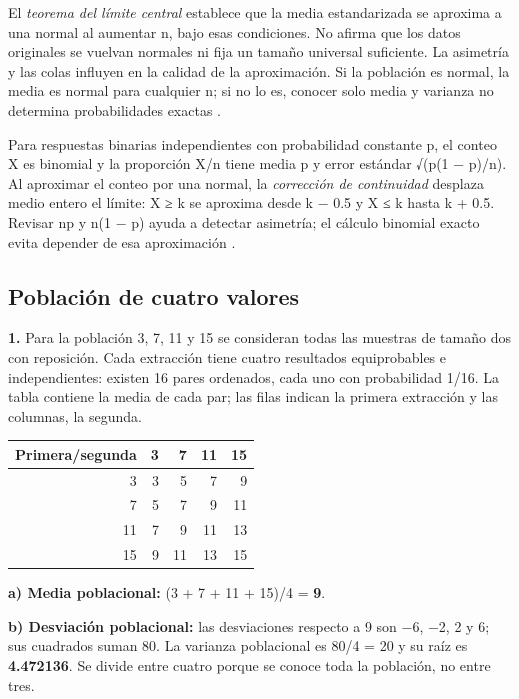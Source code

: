 {El \textit{teorema del límite central} establece que la media estandarizada se aproxima a una normal al aumentar n, bajo esas condiciones. No afirma que los datos originales se vuelvan normales ni fija un tamaño universal suficiente. La asimetría y las colas influyen en la calidad de la aproximación. Si la población es normal, la media es normal para cualquier n; si no lo es, conocer solo media y varianza no determina probabilidades exactas \citep[sec. 7.3]{wackerly2010}.

Para respuestas binarias independientes con probabilidad constante p, el conteo X es binomial y la proporción X/n tiene media p y error estándar √(p(1 − p)/n). Al aproximar el conteo por una normal, la \textit{corrección de continuidad} desplaza medio entero el límite: X ≥ k se aproxima desde k − 0.5 y X ≤ k hasta k + 0.5. Revisar np y n(1 − p) ayuda a detectar asimetría; el cálculo binomial exacto evita depender de esa aproximación \citep[sec. 7.5]{wackerly2010}.

\clearpage
\subsection{Población de cuatro valores}
\textbf{1.} Para la población 3, 7, 11 y 15 se consideran todas las muestras de tamaño dos con reposición. Cada extracción tiene cuatro resultados equiprobables e independientes: existen 16 pares ordenados, cada uno con probabilidad 1/16. La tabla contiene la media de cada par; las filas indican la primera extracción y las columnas, la segunda.

\begin{center}
\begin{tabular}{r|rrrr}
\textbf{Primera/segunda} & \textbf{3} & \textbf{7} & \textbf{11} & \textbf{15}\\\hline
3 & 3 & 5 & 7 & 9\\
7 & 5 & 7 & 9 & 11\\
11 & 7 & 9 & 11 & 13\\
15 & 9 & 11 & 13 & 15\\
\end{tabular}
\end{center}

\textbf{a) Media poblacional:} (3 + 7 + 11 + 15)/4 = \textbf{9}.

\textbf{b) Desviación poblacional:} las desviaciones respecto a 9 son −6, −2, 2 y 6; sus cuadrados suman 80. La varianza poblacional es 80/4 = 20 y su raíz es \textbf{4.472136}. Se divide entre cuatro porque se conoce toda la población, no entre tres.

}

